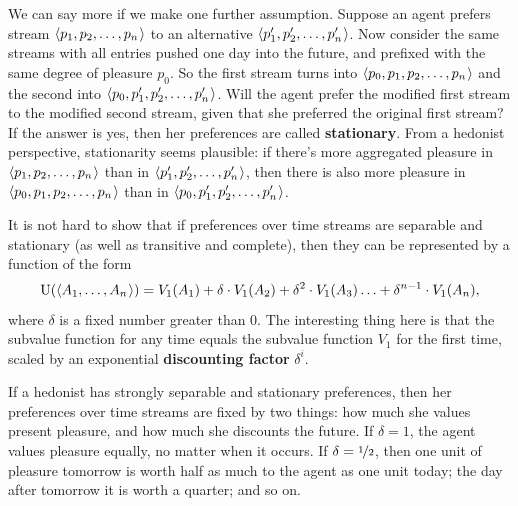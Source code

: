 We can say more if we make one further assumption. Suppose an agent prefers
stream $\t{p_1,p_2,\ldots,p_n}$ to an alternative $\t{p_1',p_2',\ldots,p_n'}$.
Now consider the same streams with all entries pushed one day into the future,
and prefixed with the same degree of pleasure $p_0$. So the first stream turns
into $\t{p_0, p_1,p_2,\ldots,p_n}$ and the second into
$\t{p_0, p_1',p_2',\ldots,p_n'}$. Will the agent prefer the modified first
stream to the modified second stream, given that she preferred the original
first stream? If the answer is yes, then her preferences are called
\textbf{stationary}. From a hedonist perspective, stationarity seems plausible:
if there's more aggregated pleasure in $\t{p_1,p_2,\ldots,p_n}$ than in
$\t{p_1',p_2',\ldots,p_n'}$, then there is also more pleasure in
$\t{p_0,p_1,p_2,\ldots,p_n}$ than in $\t{p_0,p_1',p_2',\ldots,p_n'}$.

It is not hard to show that if preferences over time streams are separable and
stationary (as well as transitive and complete), then they can be represented by
a function of the form
\[
\U(\t{A_1,\ldots,A_n}) = V_1(A_1) + \delta \cdot V_1(A_2) +
\delta^2 \cdot V_1(A_3) \ldots + \delta^{n-1} \cdot V_1(A_n),
\]
where $\delta$ is a fixed number greater than 0. The interesting thing here is
that the subvalue function for any time equals the subvalue function $V_1$ for
the first time, scaled by an exponential \textbf{discounting factor} $\delta^i$.


If a hedonist has strongly separable and stationary preferences, then her
preferences over time streams are fixed by two things: how much she values
present pleasure, and how much she discounts the future. If $\delta = 1$, the
agent values pleasure equally, no matter when it occurs. If
$\delta = \nicefrac{1}{2}$, then one unit of pleasure tomorrow is worth half as
much to the agent as one unit today; the day after tomorrow it is worth a
quarter; and so on.

